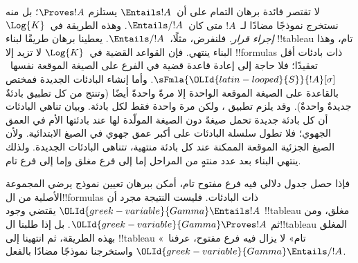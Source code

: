 \documentclass[../../../include/open-logic-section]{subfiles}
\begin{document}
      

\begin{explain}
  لا تقتصر فائدة برهان التمام على أن~$\Entails !A$ يستلزم
  $\Proves !A$؛ بل منه نستخرج نموذجًا مضادًا لـ~$!A$
  متى كان~$\Entails/ !A$. وهذه الطريقة في~$\Log{K}$ \emph{إجراء قرار}.
  فلنفرض، مثلًا،~$\Entails/ !A$. يعطينا برهان
   طريقًا لبناء !!{tableau} تام،
  وهذا البناء ينتهي. فإن القواعد القضية في~$\Log{K}$ لا تزيد إلا
  !!{formula}s ذات بادئات أقل تعقيدًا؛ فلا حاجة إلى إعادة قاعدة
  قضية في الفرع على الصيغة الموقعة نفسها~$\sFmla{{\OLId{latin-looped}{S}}}{!A}[\sigma]$.
  وأما إنشاء البادئات الجديدة فمختص بالقاعدة
  على الصيغة الموقعة الواحدة إلا مرةً واحدةً أيضًا (وتنتج من كل تطبيق
  بادئةٌ جديدةٌ واحدةٌ).
  وقد يلزم تطبيق
  ، ولكن مرة واحدة
  فقط لكل بادئة. وبيان تناهي البادئات أن كل بادئة جديدة تحمل صيغةً دون
  الصيغة المولّدة لها عند بادئتها الأم في العمق الجهوي؛ فلا تطول سلسلة
  البادئات على أكبر عمق جهوي في الصيغ الابتدائية. ولأن الصيغ الجزئية
  الموقعة الممكنة عند كل بادئة منتهية، تتناهى البادئات الجديدة. ولذلك
  ينتهي البناء بعد عدد منتهٍ من المراحل إما إلى فرع مغلق وإما إلى فرع تام.

  فإذا حصل جدول دلالي فيه فرع مفتوح تام، أمكن ببرهان
   تعيين نموذج يرضي المجموعة
  الأصلية من ال!!{formula}s ذات البادئات. فليست النتيجة مجرد أن
  ${\OLId{greek-variable}{Gamma}} \Entails !A$ يقتضي وجود !!{tableau} مغلق، ومن ثم
  ${\OLId{greek-variable}{Gamma}} \Proves !A$. بل إذا طلبنا ال!!{tableau} المغلق بهذه
  الطريقة، ثم انتهينا إلى !!{tableau} «تام» لا يزال فيه فرع مفتوح،
  عرفنا~${\OLId{greek-variable}{Gamma}} \Entails/ !A$ واستخرجنا نموذجًا مضادًا بالفعل.
\end{explain}
\end{document}
